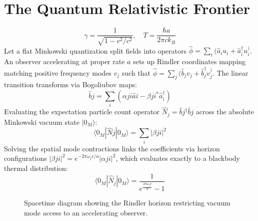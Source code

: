 \documentclass[11pt,a4paper]{article}
\begin{document}
\section{The Quantum Relativistic Frontier}
\begin{equation}
\gamma = \frac{1}{\sqrt{1 - v^2/c^2}}, \quad T = \frac{\hbar a}{2\pi c k_B}
\end{equation}
Let a flat Minkowski quantization split fields into operators $\hat{\phi} = \sum_i (\hat{a}_i u_i + \hat{a}_i^\dagger u_i^)$. An observer accelerating at proper rate $a$ sets up Rindler coordinates mapping matching positive frequency modes $v_j$ such that $\hat{\phi} = \sum_j (\hat{b}_j v_j + \hat{b}_j^\dagger v_j^)$. The linear transition transforms via Bogoliubov maps:
\begin{equation}
\hat{b}j = \sum_i (\alpha{ji}\hat{a}i - \beta{ji}^*\hat{a}_i^{\dagger})
\end{equation}
Evaluating the expectation particle count operator $\hat{N}_j = \hat{b}j^{\dagger} \hat{b}j$ across the absolute Minkowski vacuum state $|0_M\rangle$:
\begin{equation}
\langle 0_M | \hat{N}j | 0_M \rangle = \sum_i |\beta{ji}|^2
\end{equation}
Solving the spatial mode contractions links the coefficients via horizon configurations $|\beta{ji}|^2 = e^{-2\pi\omega_j c / a}|\alpha{ji}|^2$, which evaluates exactly to a blackbody thermal distribution:
\begin{equation}
\langle 0_M | \hat{N}_j | 0_M \rangle = \frac{1}{e^{\frac{2\pi\omega_j c}{a}} - 1}
\end{equation}
\begin{figure}[h!]
\centering
{}
\caption{Spacetime diagram showing the Rindler horizon restricting vacuum mode access to an accelerating observer.}
\end{figure}
\end{document}
